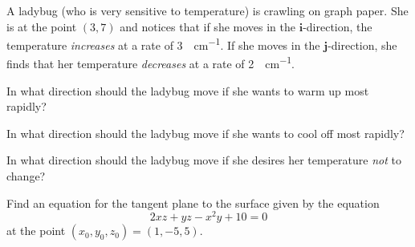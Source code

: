\documentclass[boxes]{gsypset}
\begin{document}
	\begin{problem}[2.6.12]
		A ladybug (who is very sensitive to temperature) is crawling on graph paper. 
		She is at the point $(3, 7)$ and notices that if she moves in the $\mathbf{i}$-direction,
		the temperature \textit{increases} at a rate of \SI{3}{\deg\per\cm}. 
		If she moves in the $\mathbf{j}$-direction, she finds that 
		her temperature \textit{decreases} at a rate of \SI{2}{\deg\per\cm}. 
		\begin{subproblems}
			\subproblem In what direction should the ladybug move if she wants to warm up most rapidly?
				\begin{solution}
					
				\end{solution}
				
			\subproblem In what direction should the ladybug move if she wants to cool off most rapidly?
				\begin{solution}
					
				\end{solution}
				
			\subproblem In what direction should the ladybug move if 
				she desires her temperature \textit{not} to change?
				\begin{solution}
					
				\end{solution}
		\end{subproblems}
	\end{problem}
	
	\begin{problem}[2.6.18]
		 Find an equation for the tangent plane to the surface given by the equation 
		 \[2xz+yz-x^2y+10=0\]
		 at the point $(x_0, y_0, z_0) = (1,-5,5)$.
	\end{problem}
	\begin{solution}
		
	\end{solution}
\end{document}
